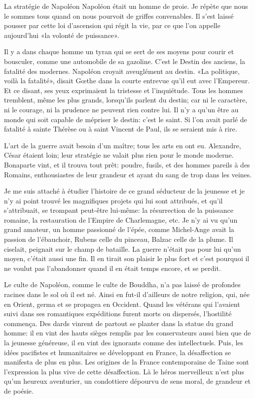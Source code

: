 \begin{chapter}{La stratégie de Napoléon}
Napoléon était un homme de proie. Je répète que nous le sommes tous
quand on nous pourvoit de griffes convenables. Il s'est laissé pousser
par cette loi d'ascension qui régit la vie, par ce que l'on appelle
aujourd'hui «la volonté de puissance».

Il y a dans chaque homme un tyran qui se sert de ses moyens pour courir
et bousculer, comme une automobile de sa gazoline. C'est le Destin des
anciens, la fatalité des modernes. Napoléon croyait aveuglément au
destin. «La politique, voilà la fatalité», disait Gœthe dans la
courte entrevue qu'il eut avec l'Empereur. Et ce disant, ses yeux
exprimaient la tristesse et l'inquiétude. Tous les hommes tremblent,
même les plus grands, lorsqu'ils parlent du destin; car ni le caractère,
ni le courage, ni la prudence ne peuvent rien contre lui. Il n'y a qu'un
être au monde qui soit capable de mépriser le destin: c'est le saint. Si
l'on avait parlé de fatalité à sainte Thérèse ou à saint Vincent de
Paul, ils se seraient mis à rire.

L'art de la guerre avait besoin d'un maître; tous les arts en ont eu.
Alexandre, César étaient loin; leur stratégie ne valait plus rien pour
le monde moderne. Bonaparte vint, et il trouva tout prêt: poudre,
fusils, et des hommes pareils à des Romains, enthousiastes de leur
grandeur et ayant du sang de trop dans les veines.

Je me suis attaché à étudier l'histoire de ce grand séducteur de la
jeunesse et je n'y ai point trouvé les magnifiques projets qui lui sont
attribués, et qu'il s'attribuait, se trompant peut-être lui-même: la
résurrection de la puissance romaine, la restauration de l'Empire de
Charlemagne, etc. Je n'y ai vu qu'un grand amateur, un homme passionné
de l'épée, comme Michel-Ange avait la passion de l'ébauchoir, Rubens
celle du pinceau, Balzac celle de la plume. Il ciselait, peignait sur le
champ de bataille. La guerre n'était pas pour lui qu'un moyen, c'était
aussi une fin. Il en tirait son plaisir le plus fort et c'est pourquoi
il ne voulut pas l'abandonner quand il en était temps encore, et se
perdit.

Le culte de Napoléon, comme le culte de Bouddha, n'a pas laissé de
profondes racines dans le sol où il est né. Ainsi en fut-il d'ailleurs
de notre religion, qui, née en Orient, germa et se propagea en Occident.
Quand les vétérans qui l'avaient suivi dans ses romantiques expéditions
furent morts ou dispersés, l'hostilité commença. Des dards vinrent de
partout se planter dans la statue du grand homme: il en vint des hauts
sièges remplis par les conservateurs aussi bien que de la jeunesse
généreuse, il en vint des ignorants comme des intellectuels. Puis, les
idées pacifistes et humanitaires se développant en France, la
désaffection se manifesta de plus en plus. Les origines de la France
contemporaine de Taine sont l'expression la plus vive de cette
désaffection. Là le héros merveilleux n'est plus qu'un heureux
aventurier, un condottiere dépourvu de sens moral, de grandeur et de
poésie.


\end{chapter}
